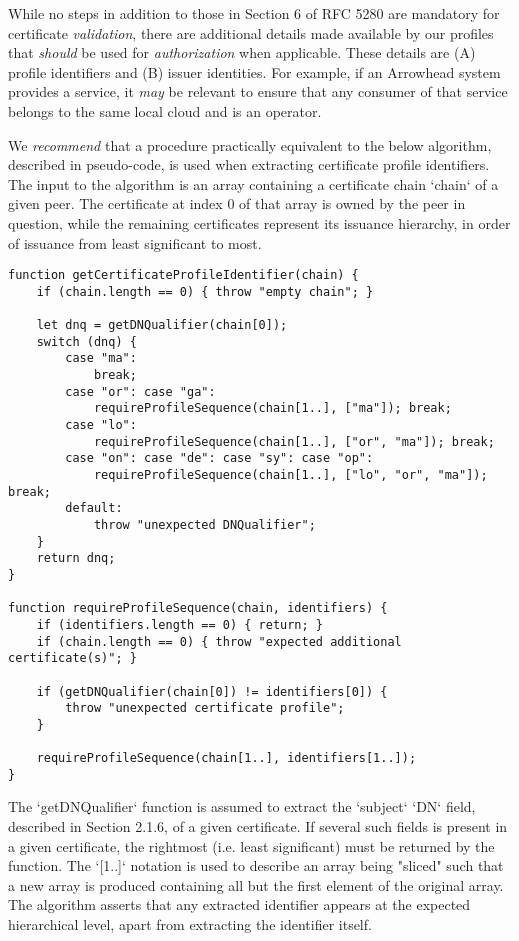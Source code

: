 %
%

While no steps in addition to those in Section 6 of RFC 5280 are mandatory for certificate \textit{validation}, there are additional details made available by our profiles that \textit{should} be used for \textit{authorization} when applicable.
These details are (A) profile identifiers and (B) issuer identities.
For example, if an Arrowhead system provides a service, it \textit{may} be relevant to ensure that any consumer of that service belongs to the same local cloud and is an operator.

We \textit{recommend} that a procedure practically equivalent to the below algorithm, described in pseudo-code, is used when extracting certificate profile identifiers.
The input to the algorithm is an array containing a certificate chain `chain` of a given peer.
The certificate at index 0 of that array is owned by the peer in question, while the remaining certificates represent its issuance hierarchy, in order of issuance from least significant to most.

\begin{verbatim}
function getCertificateProfileIdentifier(chain) {
    if (chain.length == 0) { throw "empty chain"; }

    let dnq = getDNQualifier(chain[0]);
    switch (dnq) {
        case "ma":
            break;
        case "or": case "ga":
            requireProfileSequence(chain[1..], ["ma"]); break;
        case "lo":
            requireProfileSequence(chain[1..], ["or", "ma"]); break;
        case "on": case "de": case "sy": case "op":
            requireProfileSequence(chain[1..], ["lo", "or", "ma"]); break;
        default:
            throw "unexpected DNQualifier";
    }
    return dnq;
}

function requireProfileSequence(chain, identifiers) {
    if (identifiers.length == 0) { return; }
    if (chain.length == 0) { throw "expected additional certificate(s)"; }

    if (getDNQualifier(chain[0]) != identifiers[0]) {
        throw "unexpected certificate profile";
    }

    requireProfileSequence(chain[1..], identifiers[1..]);
}
\end{verbatim}

The `getDNQualifier` function is assumed to extract the `subject` `DN` field, described in Section 2.1.6, of a given certificate.
If several such fields is present in a given certificate, the rightmost (i.e. least significant) must be returned by the function.
The `[1..]` notation is used to describe an array being "sliced" such that a new array is produced containing all but the first element of the original array.
The algorithm asserts that any extracted identifier appears at the expected hierarchical level, apart from extracting the identifier itself.

